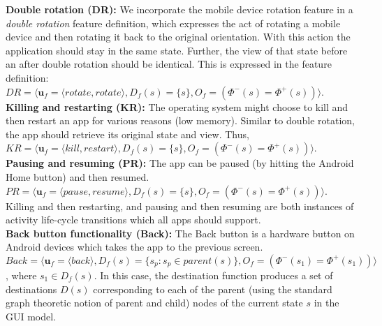

{\bf Double rotation (DR):} We incorporate the mobile device rotation feature in a \textit{double rotation} feature definition, which expresses the act of rotating a mobile device and then rotating it back to the original orientation. With this action the application should stay in the same state. Further, the view of that state before an after double rotation should be identical. This is expressed in the feature definition: $\mathit{DR} = \langle \mathbf{u}_f = \langle rotate, rotate\rangle, D_f(s) = \{s \}, O_f = (\Phi^-(s) = \Phi^+(s)) \rangle$.
\\
\indent
{\bf Killing and restarting (KR):} The operating system might choose to kill and then restart an app for various reasons (\eg low memory). Similar to double rotation, the app should retrieve its original state and view. Thus, $ \mathit{KR} = \langle \mathbf{u}_f = \langle kill, restart\rangle, D_f(s) = \{s \}, O_f = (\Phi^-(s) = \Phi^+(s)) \rangle$.
\\
\indent
{\bf Pausing and resuming (PR):} The app can be paused (\eg by hitting the Android Home button) and then resumed. $ \mathit{PR} = \langle \mathbf{u}_f = \langle pause, resume\rangle, D_f(s) = \{s \}, O_f = (\Phi^-(s) = \Phi^+(s)) \rangle$. Killing and then restarting, and pausing and then resuming are both instances of activity life-cycle transitions which all apps should support.
\\
\indent
{\bf Back button functionality (Back):} The Back button is a hardware button on Android devices which takes the app to the previous screen. $ \mathit{Back} = \langle \mathbf{u}_f = \langle back \rangle, D_f(s) = \{s_p : s_p \in parent(s) \}, O_f = (\Phi^-(s_1) = \Phi^+(s_1)) \rangle$, where $s_1 \in D_f(s)$. In this case, the destination function produces a set of destinations $D(s)$ corresponding to each of the parent (using the standard graph theoretic notion of parent and child) nodes of the current state $s$ in the GUI model.
